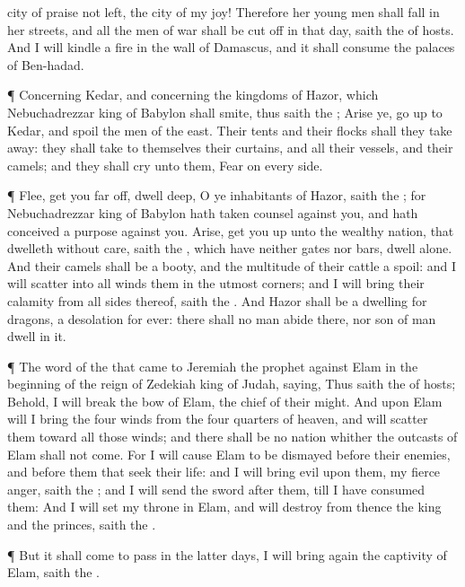 {city of
praise not
left, the
city of my
joy!
Therefore her young
men shall
fall in her
streets, and all the
men of
war shall be cut
off in that
day,
saith the
{} of
hosts.
And I will
kindle a
fire in the
wall of
Damascus, and it shall
consume the
palaces of
Ben-hadad.
\par }{\PP {}¶ Concerning
Kedar, and concerning the
kingdoms of
Hazor, which
Nebuchadrezzar
king of
Babylon shall
smite, thus
saith the
{};
Arise ye, go
up to
Kedar, and
spoil the
men of the
east.
Their
tents and their
flocks shall they take
away: they shall
take to themselves their
curtains, and all their
vessels, and their
camels; and they shall
cry unto them,
Fear
{} on every
side.
\par }{\PP {}¶
Flee,
get you far
off,
dwell
deep, O ye
inhabitants of
Hazor,
saith the
{}; for
Nebuchadrezzar
king of
Babylon hath taken
counsel against you, and hath
conceived a
purpose against you.
Arise, get you
up unto the
wealthy
nation, that
dwelleth without
care,
saith the
{}, which have neither
gates nor
bars,
{}
dwell
alone.
And their
camels shall be a
booty, and the
multitude of their
cattle a
spoil: and I will
scatter into all
winds them
{} in the
utmost
corners; and I will
bring their
calamity from all
sides thereof,
saith the
{}.
And
Hazor shall be a
dwelling for
dragons,
{} a
desolation
for
ever: there shall no
man
abide there, nor
{}
son of
man
dwell in it.
\par }{\PP {}¶ The
word of the
{} that came to
Jeremiah the
prophet against
Elam in the
beginning of the
reign of
Zedekiah
king of
Judah,
saying,
Thus
saith the
{} of
hosts; Behold, I will
break the
bow of
Elam, the
chief of their
might.
And upon
Elam will I
bring the
four
winds from the
four
quarters of
heaven, and will
scatter them toward all those
winds; and there shall be no
nation whither the
outcasts of
Elam shall not
come.
For I will cause
Elam to be
dismayed
before their
enemies, and
before them that
seek their
life: and I will
bring
evil upon them,
{} my
fierce
anger,
saith the
{}; and I will
send the
sword
after them, till I have
consumed them:
And I will
set my
throne in
Elam, and will
destroy from thence the
king and the
princes,
saith the
{}.
\par }{\PP {}¶ But it shall come to pass in the
latter
days,
{} I will bring
again the
captivity of
Elam,
saith the
{}.

}
